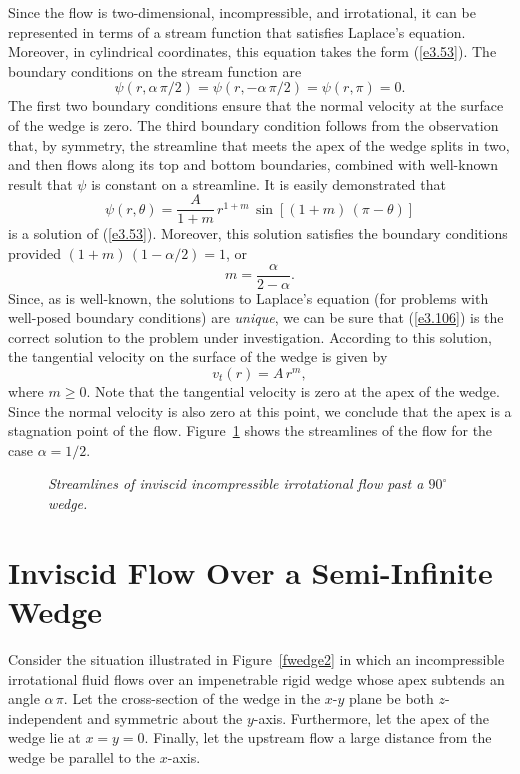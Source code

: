 Since the flow is two-dimensional, incompressible, and irrotational, it can be represented in terms of a stream function that
satisfies Laplace's equation. Moreover, in cylindrical coordinates, this equation takes the form (\ref{e3.53}). The
boundary conditions on the stream function are
\begin{equation}
\psi(r,\alpha\,\pi/2) =\psi(r,-\alpha\,\pi/2)=\psi(r,\pi)=0.
\end{equation}
The first two boundary conditions ensure that the normal velocity at the surface of the wedge is zero. The third boundary condition
follows from the observation that, by symmetry, the streamline that meets the apex of the wedge splits in two, and then flows along its 
top and bottom boundaries, combined with well-known  result that $\psi$ is constant on a streamline.
It is easily demonstrated that
\begin{equation}\label{e3.106}
\psi(r,\theta) = \frac{A}{1+m}\,r^{1+m}\,\sin\left[(1+m)\,(\pi-\theta)\right]
\end{equation}
is a solution of (\ref{e3.53}). Moreover, this solution satisfies the boundary conditions provided  
$(1+m)\,(1-\alpha/2) = 1$, or
\begin{equation}
m=\frac{\alpha}{2-\alpha}.
\end{equation}
Since, as is well-known, the solutions to Laplace's equation (for problems with well-posed boundary conditions) are
{\em unique}, we can be sure that (\ref{e3.106}) is the correct 
solution to the problem under investigation. According to this solution, the tangential velocity on the surface of the
wedge is given by
\begin{equation}
v_t(r) = A\,r^m,
\end{equation}
where $m\geq 0$. 
Note that the tangential velocity is zero at the apex of the wedge. Since the normal velocity is also zero at this point, we
conclude that the apex is a stagnation point of the flow. Figure~\ref{fwedge1} shows the streamlines of the
flow for the case $\alpha=1/2$. 

\begin{figure}
\epsfysize=3in
\centerline{}
\caption{\em Streamlines of inviscid incompressible irrotational flow past a $90^\circ$ wedge.}\label{fwedge1}
\end{figure}

\section{Inviscid Flow Over a Semi-Infinite Wedge}\label{swedge1}
Consider the situation illustrated in Figure~\ref{fwedge2} in which an incompressible irrotational fluid flows over an
impenetrable rigid wedge whose apex subtends an angle $\alpha\,\pi$. Let the cross-section of the wedge in the $x$-$y$ plane
be both $z$-independent and symmetric about the $y$-axis. Furthermore, let the apex of
the wedge lie at $x=y=0$. Finally, let the upstream flow a large distance from the
wedge be parallel to the $x$-axis.

